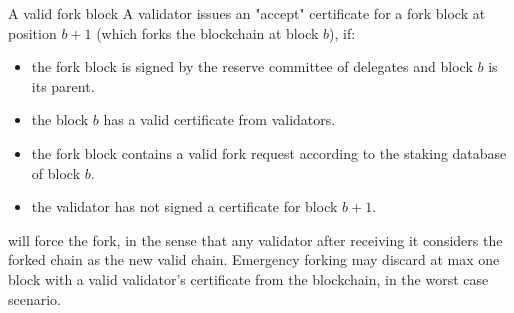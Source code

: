 A valid fork block
A validator issues
an "accept" certificate for a fork block at position $b + 1$ (which forks the blockchain at block $b$), if:
\begin{itemize}
    \item the fork block is signed by the reserve committee of delegates and block $b$ is its parent.
    \item the block $b$ has a valid certificate from validators.
    \item the fork block contains a valid fork request according to the staking database of block $b$.
    \item the validator has not signed a certificate for block $b + 1$.
\end{itemize}

will force the fork, in the sense that any validator after receiving it considers the forked chain as the new
valid chain.
Emergency forking may discard at max one block with a valid validator's certificate
from the blockchain, in the worst case scenario.
